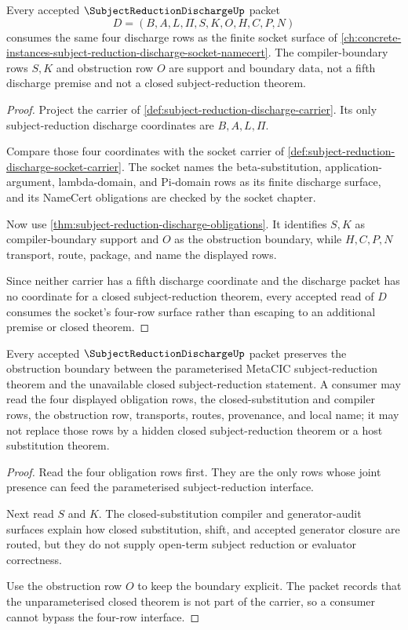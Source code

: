 \begin{theorem}
\label{thm:subject-reduction-discharge-socket-dependency}
Every accepted $\SubjectReductionDischargeUp$ packet
$$
D=(B,A,L,\Pi,S,K,O,H,C,P,N)
$$
consumes the same four discharge rows as the finite socket surface of \autoref{ch:concrete-instances-subject-reduction-discharge-socket-namecert}. The compiler-boundary rows $S,K$ and obstruction row $O$ are support and boundary data, not a fifth discharge premise and not a closed subject-reduction theorem.
\end{theorem}
\begin{proof}
Project the carrier of \autoref{def:subject-reduction-discharge-carrier}. Its only subject-reduction discharge coordinates are $B,A,L,\Pi$.

Compare those four coordinates with the socket carrier of \autoref{def:subject-reduction-discharge-socket-carrier}. The socket names the beta-substitution, application-argument, lambda-domain, and Pi-domain rows as its finite discharge surface, and its NameCert obligations are checked by the socket chapter.

Now use \autoref{thm:subject-reduction-discharge-obligations}. It identifies $S,K$ as compiler-boundary support and $O$ as the obstruction boundary, while $H,C,P,N$ transport, route, package, and name the displayed rows.

Since neither carrier has a fifth discharge coordinate and the discharge packet has no coordinate for a closed subject-reduction theorem, every accepted read of $D$ consumes the socket's four-row surface rather than escaping to an additional premise or closed theorem.
\end{proof}

\begin{theorem}
\label{thm:subject-reduction-discharge-boundary}
Every accepted $\SubjectReductionDischargeUp$ packet preserves the obstruction boundary between the parameterised MetaCIC subject-reduction theorem and the unavailable closed subject-reduction statement. A consumer may read the four displayed obligation rows, the closed-substitution and compiler rows, the obstruction row, transports, routes, provenance, and local name; it may not replace those rows by a hidden closed subject-reduction theorem or a host substitution theorem.
\end{theorem}
\begin{proof}
Read the four obligation rows first. They are the only rows whose joint presence can feed the parameterised subject-reduction interface.

Next read $S$ and $K$. The closed-substitution compiler and generator-audit surfaces explain how closed substitution, shift, and accepted generator closure are routed, but they do not supply open-term subject reduction or evaluator correctness.

Use the obstruction row $O$ to keep the boundary explicit. The packet records that the unparameterised closed theorem is not part of the carrier, so a consumer cannot bypass the four-row interface.
\end{proof}

